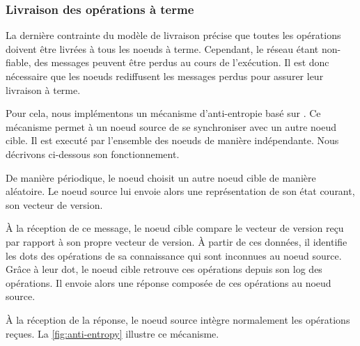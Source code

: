 \subsubsection{Livraison des opérations à terme}

\label{sec:mute-anti-entropy}

La dernière contrainte du modèle de livraison précise que toutes les opérations doivent être livrées à tous les noeuds à terme.
Cependant, le réseau étant non-fiable, des messages peuvent être perdus au cours de l'exécution.
Il est donc nécessaire que les noeuds rediffusent les messages perdus pour assurer leur livraison à terme.

Pour cela, nous implémentons un mécanisme d'anti-entropie basé sur \cite{1983-anti-entropy-vv}.
Ce mécanisme permet à un noeud source de se synchroniser avec un autre noeud cible.
Il est executé par l'ensemble des noeuds de manière indépendante.
Nous décrivons ci-dessous son fonctionnement.

De manière périodique, le noeud choisit un autre noeud cible de manière aléatoire.
Le noeud source lui envoie alors une représentation de son état courant, \ie son vecteur de version.

À la réception de ce message, le noeud cible compare le vecteur de version reçu par rapport à son propre vecteur de version.
À partir de ces données, il identifie les dots des opérations de sa connaissance qui sont inconnues au noeud source.
Grâce à leur dot, le noeud cible retrouve ces opérations depuis son log des opérations.
Il envoie alors une réponse composée de ces opérations au noeud source.

À la réception de la réponse, le noeud source intègre normalement les opérations reçues.
La \autoref{fig:anti-entropy} illustre ce mécanisme.

